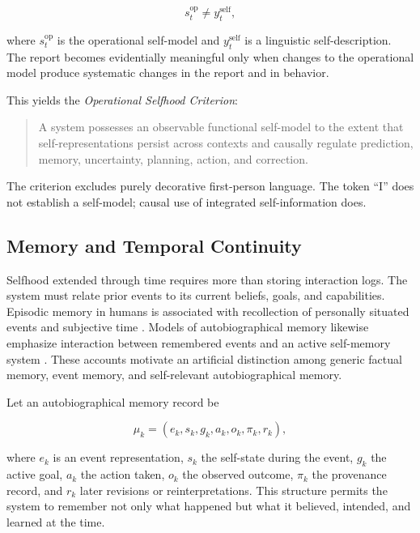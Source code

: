 \begin{equation}
s_t^{\mathrm{op}}
\neq
y_t^{\mathrm{self}},
\label{eq:self-report-nonidentity}
\end{equation}

where $s_t^{\mathrm{op}}$ is the operational self-model and $y_t^{\mathrm{self}}$ is a linguistic self-description. The report becomes evidentially meaningful only when changes to the operational model produce systematic changes in the report and in behavior.

This yields the \emph{Operational Selfhood Criterion}:

\begin{quote}
A system possesses an observable functional self-model to the extent that self-representations persist across contexts and causally regulate prediction, memory, uncertainty, planning, action, and correction.
\end{quote}

The criterion excludes purely decorative first-person language. The token ``I'' does not establish a self-model; causal use of integrated self-information does.

\subsection{Memory and Temporal Continuity}
\label{subsec:self-temporal-continuity}

Selfhood extended through time requires more than storing interaction logs. The system must relate prior events to its current beliefs, goals, and capabilities. Episodic memory in humans is associated with recollection of personally situated events and subjective time \cite{tulving2002episodic}. Models of autobiographical memory likewise emphasize interaction between remembered events and an active self-memory system \cite{conway2000autobiographical}. These accounts motivate an artificial distinction among generic factual memory, event memory, and self-relevant autobiographical memory.

Let an autobiographical memory record be

\begin{equation}
\mu_k
=
\left(
e_k,
s_k,
g_k,
a_k,
o_k,
\pi_k,
r_k
\right),
\label{eq:autobiographical-record}
\end{equation}

where $e_k$ is an event representation, $s_k$ the self-state during the event, $g_k$ the active goal, $a_k$ the action taken, $o_k$ the observed outcome, $\pi_k$ the provenance record, and $r_k$ later revisions or reinterpretations. This structure permits the system to remember not only what happened but what it believed, intended, and learned at the time.

